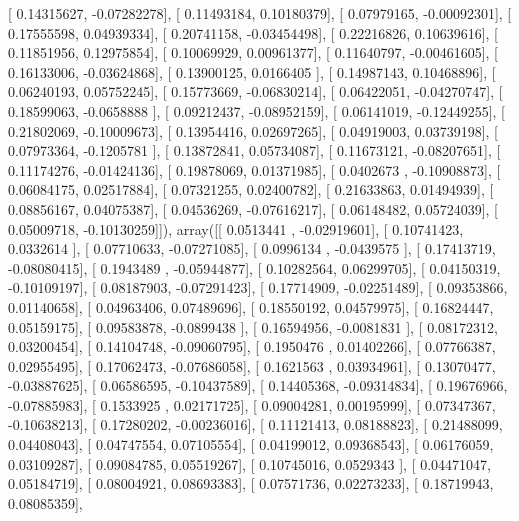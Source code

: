 \documentclass{article}
\begin{document}
       [ 0.14315627, -0.07282278],
       [ 0.11493184,  0.10180379],
       [ 0.07979165, -0.00092301],
       [ 0.17555598,  0.04939334],
       [ 0.20741158, -0.03454498],
       [ 0.22216826,  0.10639616],
       [ 0.11851956,  0.12975854],
       [ 0.10069929,  0.00961377],
       [ 0.11640797, -0.00461605],
       [ 0.16133006, -0.03624868],
       [ 0.13900125,  0.0166405 ],
       [ 0.14987143,  0.10468896],
       [ 0.06240193,  0.05752245],
       [ 0.15773669, -0.06830214],
       [ 0.06422051, -0.04270747],
       [ 0.18599063, -0.0658888 ],
       [ 0.09212437, -0.08952159],
       [ 0.06141019, -0.12449255],
       [ 0.21802069, -0.10009673],
       [ 0.13954416,  0.02697265],
       [ 0.04919003,  0.03739198],
       [ 0.07973364, -0.1205781 ],
       [ 0.13872841,  0.05734087],
       [ 0.11673121, -0.08207651],
       [ 0.11174276, -0.01424136],
       [ 0.19878069,  0.01371985],
       [ 0.0402673 , -0.10908873],
       [ 0.06084175,  0.02517884],
       [ 0.07321255,  0.02400782],
       [ 0.21633863,  0.01494939],
       [ 0.08856167,  0.04075387],
       [ 0.04536269, -0.07616217],
       [ 0.06148482,  0.05724039],
       [ 0.05009718, -0.10130259]]), array([[ 0.0513441 , -0.02919601],
       [ 0.10741423,  0.0332614 ],
       [ 0.07710633, -0.07271085],
       [ 0.0996134 , -0.0439575 ],
       [ 0.17413719, -0.08080415],
       [ 0.1943489 , -0.05944877],
       [ 0.10282564,  0.06299705],
       [ 0.04150319, -0.10109197],
       [ 0.08187903, -0.07291423],
       [ 0.17714909, -0.02251489],
       [ 0.09353866,  0.01140658],
       [ 0.04963406,  0.07489696],
       [ 0.18550192,  0.04579975],
       [ 0.16824447,  0.05159175],
       [ 0.09583878, -0.0899438 ],
       [ 0.16594956, -0.0081831 ],
       [ 0.08172312,  0.03200454],
       [ 0.14104748, -0.09060795],
       [ 0.1950476 ,  0.01402266],
       [ 0.07766387,  0.02955495],
       [ 0.17062473, -0.07686058],
       [ 0.1621563 ,  0.03934961],
       [ 0.13070477, -0.03887625],
       [ 0.06586595, -0.10437589],
       [ 0.14405368, -0.09314834],
       [ 0.19676966, -0.07885983],
       [ 0.1533925 ,  0.02171725],
       [ 0.09004281,  0.00195999],
       [ 0.07347367, -0.10638213],
       [ 0.17280202, -0.00236016],
       [ 0.11121413,  0.08188823],
       [ 0.21488099,  0.04408043],
       [ 0.04747554,  0.07105554],
       [ 0.04199012,  0.09368543],
       [ 0.06176059,  0.03109287],
       [ 0.09084785,  0.05519267],
       [ 0.10745016,  0.0529343 ],
       [ 0.04471047,  0.05184719],
       [ 0.08004921,  0.08693383],
       [ 0.07571736,  0.02273233],
       [ 0.18719943,  0.08085359],
\end{document}
